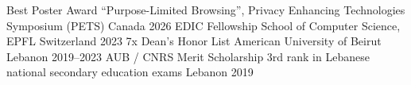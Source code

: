 



\begin{cvhonors}

  \cvhonor
    {Best Poster Award} %
    {``Purpose-Limited Browsing'', Privacy Enhancing Technologies Symposium (PETS)} %
    {Canada} %
    {2026} %
  \cvhonor
    {EDIC Fellowship} %
    {School of Computer Science, EPFL} %
    {Switzerland} %
    {2023} %
  \cvhonor
    {7x Dean's Honor List} %
    {American University of Beirut} %
    {Lebanon} %
    {2019--2023} %
  \cvhonor
    {AUB / CNRS Merit Scholarship} %
    {3rd rank in Lebanese national secondary education exams} %
    {Lebanon} %
    {2019} %
\end{cvhonors}
